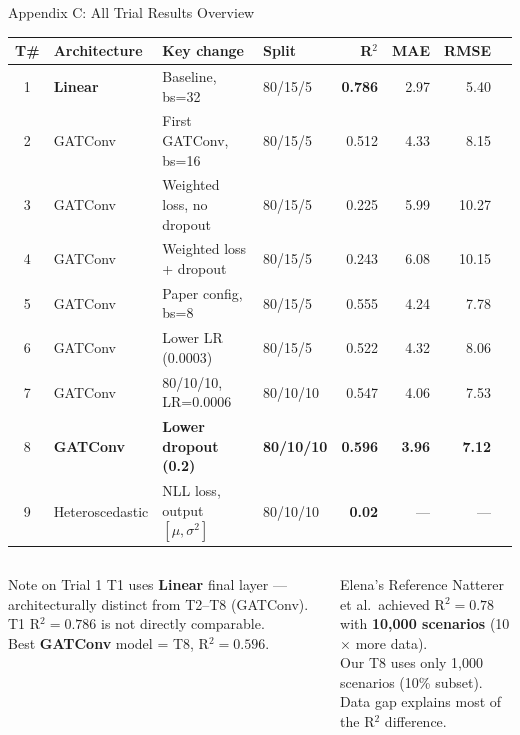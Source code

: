 \documentclass[aspectratio=169,10pt]{beamer}
\newcommand{\emphblue}[1]{\textcolor{tumblue}{\textbf{#1}}}
\newcommand{\emphred}[1]{\textcolor{tumred}{\textbf{#1}}}
\newcommand{\emphgreen}[1]{\textcolor{tumgreen}{\textbf{#1}}}
\begin{document}
\begin{frame}{Appendix C: All Trial Results Overview}
  \centering
  \renewcommand{\arraystretch}{1.35}
  \begin{tabular}{clllrrrr}
    \toprule
    \textbf{T\#} & \textbf{Architecture} & \textbf{Key change} & \textbf{Split} & \textbf{R}$^2$ & \textbf{MAE} & \textbf{RMSE} \\
    \midrule
    1 & \emphblue{Linear} & Baseline, bs=32 & 80/15/5 & \emphblue{0.786} & 2.97 & 5.40 \\
    2 & GATConv & First GATConv, bs=16 & 80/15/5 & 0.512 & 4.33 & 8.15 \\
    3 & GATConv & Weighted loss, no dropout & 80/15/5 & 0.225 & 5.99 & 10.27 \\
    4 & GATConv & Weighted loss + dropout & 80/15/5 & 0.243 & 6.08 & 10.15 \\
    5 & GATConv & Paper config, bs=8 & 80/15/5 & 0.555 & 4.24 & 7.78 \\
    6 & GATConv & Lower LR (0.0003) & 80/15/5 & 0.522 & 4.32 & 8.06 \\
    7 & GATConv & 80/10/10, LR=0.0006 & 80/10/10 & 0.547 & 4.06 & 7.53 \\
    8 & \emphgreen{GATConv} & \emphgreen{Lower dropout (0.2)} & \emphgreen{80/10/10} & \emphgreen{0.596} & \emphgreen{3.96} & \emphgreen{7.12} \\
    9 & Heteroscedastic & NLL loss, output $[\mu, \sigma^2]$ & 80/10/10 & \emphred{0.02} & --- & --- \\
    \bottomrule
  \end{tabular}

  \vspace{0.8em}
  \begin{columns}
      \begin{alertblock}{Note on Trial 1}
        T1 uses \textbf{Linear} final layer — architecturally distinct from T2--T8 (GATConv).\\
        T1 R$^2=0.786$ is not directly comparable.\\
        Best \textbf{GATConv} model = T8, R$^2=0.596$.
      \end{alertblock}
      \begin{block}{Elena's Reference}
        Natterer et al.\ achieved R$^2 = 0.78$\\ with \textbf{10,000 scenarios} (10$\times$ more data).\\
        Our T8 uses only 1,000 scenarios (10\% subset).\\
        Data gap explains most of the R$^2$ difference.
      \end{block}
  \end{columns}
\end{frame}

\end{document}
